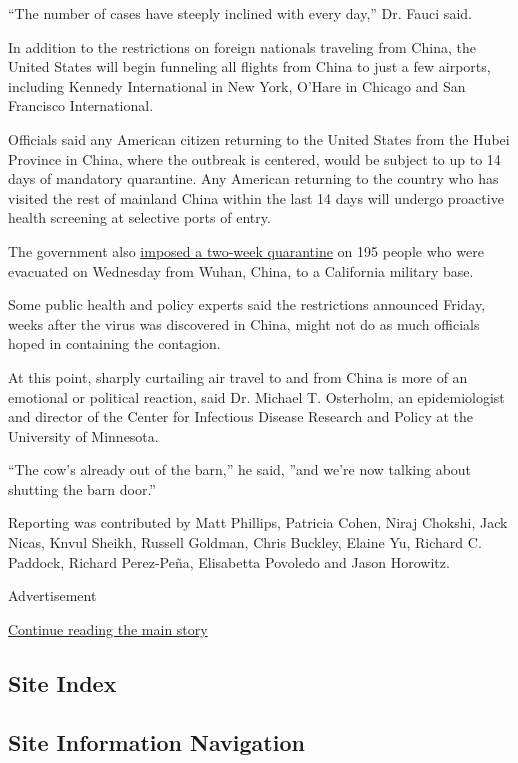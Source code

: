 ``The number of cases have steeply inclined with every day,'' Dr. Fauci
said.

In addition to the restrictions on foreign nationals traveling from
China, the United States will begin funneling all flights from China to
just a few airports, including Kennedy International in New York, O'Hare
in Chicago and San Francisco International.

Officials said any American citizen returning to the United States from
the Hubei Province in China, where the outbreak is centered, would be
subject to up to 14 days of mandatory quarantine. Any American returning
to the country who has visited the rest of mainland China within the
last 14 days will undergo proactive health screening at selective ports
of entry.

The government also
\href{https://www.nytimes3xbfgragh.onion/2020/01/31/health/quarantine-coronavirus.html}{imposed
a two-week quarantine} on 195 people who were evacuated on Wednesday
from Wuhan, China, to a California military base.

Some public health and policy experts said the restrictions announced
Friday, weeks after the virus was discovered in China, might not do as
much officials hoped in containing the contagion.

At this point, sharply curtailing air travel to and from China is more
of an emotional or political reaction, said Dr. Michael T. Osterholm, an
epidemiologist and director of the Center for Infectious Disease
Research and Policy at the University of Minnesota.

``The cow's already out of the barn,'' he said, ''and we're now talking
about shutting the barn door.''

Reporting was contributed by Matt Phillips, Patricia Cohen, Niraj
Chokshi, Jack Nicas, Knvul Sheikh, Russell Goldman, Chris Buckley,
Elaine Yu, Richard C. Paddock, Richard Perez-Peña, Elisabetta Povoledo
and Jason Horowitz.

Advertisement

\protect\hyperlink{after-bottom}{Continue reading the main story}

\hypertarget{site-index}{%
\subsection{Site Index}\label{site-index}}

\hypertarget{site-information-navigation}{%
\subsection{Site Information
Navigation}\label{site-information-navigation}}

